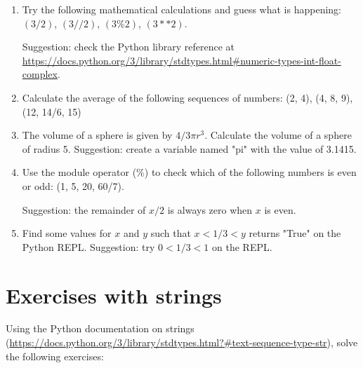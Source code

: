 \begin{enumerate}

\item Try the following mathematical calculations and guess what is happening: $(3 / 2)$, $(3 // 2)$, $(3 \% 2)$, $(3**2)$.

Suggestion: check the Python library reference at \url{https://docs.python.org/3/library/stdtypes.html#numeric-types-int-float-complex}.

\item Calculate the average of the following sequences of numbers: (2, 4), (4, 8, 9), (12, 14/6, 15)

\item The volume of a sphere is given by $4/3\pi r^3$. Calculate the volume of a sphere of radius 5. Suggestion: create a variable named "pi" with the value of 3.1415.

\item Use the module operator (\%) to check which of the following numbers is even or odd: (1, 5, 20, 60/7).

Suggestion: the remainder of $x/2$ is always zero when $x$ is even.

\item Find some values for $x$ and $y$ such that $x < 1/3 < y$ returns "True" on the Python REPL. Suggestion: try $0 < 1/3 < 1$ on the REPL.

\end{enumerate}

\section{Exercises with strings}

Using the Python documentation on strings (\url{https://docs.python.org/3/library/stdtypes.html?#text-sequence-type-str}), solve the following exercises:

